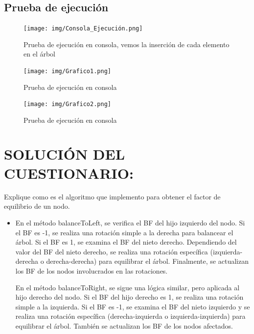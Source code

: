 \documentclass{article}
\begin{document}
        \clearpage  
            \subsection{Prueba de ejecución}
                \begin{figure}
                    \centering
                    \texttt{[image: img/Consola\_Ejecución.png]}
                    \caption{Prueba de ejecución en consola, vemos la inserción de cada elemento en el árbol}
                \end{figure}
                \begin{figure}
                    \centering
                    \texttt{[image: img/Grafico1.png]}
                    \caption{Prueba de ejecución en consola}
                \end{figure}
                \begin{figure}
                    \centering
                    \texttt{[image: img/Grafico2.png]}
                    \caption{Prueba de ejecución en consola}
                \end{figure}
        \clearpage  
        \section{SOLUCIÓN DEL CUESTIONARIO:}
            Explique como es el algoritmo que implemento para obtener el factor de equilibrio de un nodo.
            \begin{itemize}
                \item En el método balanceToLeft, se verifica el BF del hijo izquierdo del nodo. Si el BF es -1, se realiza una rotación simple a la derecha para balancear el árbol. Si el BF es 1, se examina el BF del nieto derecho. Dependiendo del valor del BF del nieto derecho, se realiza una rotación específica (izquierda-derecha o derecha-derecha) para equilibrar el árbol. Finalmente, se actualizan los BF de los nodos involucrados en las rotaciones.
                
                En el método balanceToRight, se sigue una lógica similar, pero aplicada al hijo derecho del nodo. Si el BF del hijo derecho es 1, se realiza una rotación simple a la izquierda. Si el BF es -1, se examina el BF del nieto izquierdo y se realiza una rotación específica (derecha-izquierda o izquierda-izquierda) para equilibrar el árbol. También se actualizan los BF de los nodos afectados.
            \end{itemize}
        \clearpage
\end{document}
